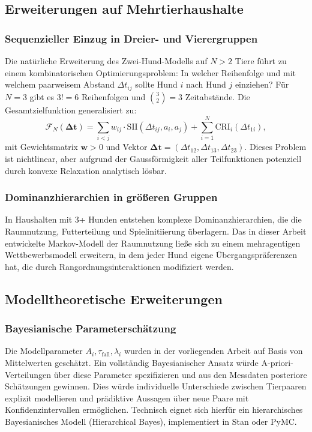 ﻿\documentclass[12pt, a4paper]{article}
\theoremstyle{plain}
\theoremstyle{definition}
\theoremstyle{remark}
\newcommand{\SII}{\mathrm{SII}}
\newcommand{\CRI}{\mathrm{CRI}}
\newcommand{\dt}{\Delta t}
\begin{document}
\subsection{Erweiterungen auf Mehrtierhaushalte}

\subsubsection{Sequenzieller Einzug in Dreier- und Vierergruppen}

Die natürliche Erweiterung des Zwei-Hund-Modells auf $N > 2$ Tiere führt zu
einem kombinatorischen Optimierungsproblem: In welcher Reihenfolge und mit
welchem paarweisem Abstand $\dt_{ij}$ sollte Hund $i$ nach Hund $j$ einziehen?
Für $N = 3$ gibt es $3! = 6$ Reihenfolgen und $\binom{3}{2} = 3$
Zeitabstände. Die Gesamtzielfunktion generalisiert zu:
\begin{equation}
  \mathcal{F}_N(\bm{\dt}) = \sum_{i<j} w_{ij} \cdot \SII(\dt_{ij}, a_i, a_j) + \sum_{i=1}^N \CRI_i(\dt_{1i}),
\end{equation}
mit Gewichtsmatrix $\bm{w} > 0$ und Vektor $\bm{\dt} = (\dt_{12}, \dt_{13}, \dt_{23})$.
Dieses Problem ist nichtlinear, aber aufgrund der Gaussförmigkeit aller Teilfunktionen
potenziell durch konvexe Relaxation analytisch lösbar.

\subsubsection{Dominanzhierarchien in größeren Gruppen}

In Haushalten mit 3+ Hunden entstehen komplexe Dominanzhierarchien, die die
Raumnutzung, Futterteilung und Spielinitiierung überlagern. Das in dieser
Arbeit entwickelte Markov-Modell der Raumnutzung ließe sich zu einem
mehragentigen Wettbewerbsmodell erweitern, in dem jeder Hund eigene
Übergangspräferenzen hat, die durch Rangordnungsinteraktionen modifiziert
werden.

\subsection{Modelltheoretische Erweiterungen}

\subsubsection{Bayesianische Parameterschätzung}

Die Modellparameter $A_i, \tau_{\mathrm{fall}}, \lambda_i$ wurden in der
vorliegenden Arbeit auf Basis von Mittelwerten geschätzt. Ein vollständig
Bayesianischer Ansatz würde A-priori-Verteilungen über diese Parameter
spezifizieren und aus den Messdaten posteriore Schätzungen gewinnen.
Dies würde individuelle Unterschiede zwischen Tierpaaren explizit modellieren
und prädiktive Aussagen über neue Paare mit Konfidenzintervallen ermöglichen.
Technisch eignet sich hierfür ein hierarchisches Bayesianisches Modell
(Hierarchical Bayes), implementiert in Stan oder PyMC.
\end{document}
